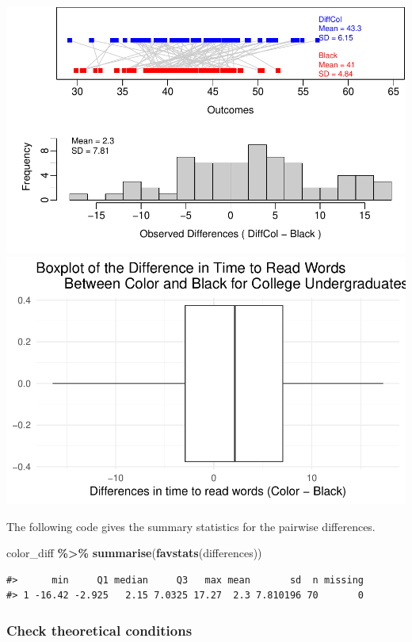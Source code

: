 \documentclass[
]{report}
\newenvironment{Shaded}{\begin{snugshade}}{\end{snugshade}}
\newcommand{\FunctionTok}[1]{\textcolor[rgb]{0.13,0.29,0.53}{\textbf{#1}}}
\newcommand{\NormalTok}[1]{#1}
\newcommand{\SpecialCharTok}[1]{\textcolor[rgb]{0.81,0.36,0.00}{\textbf{#1}}}
\begin{document}
\begin{center}\includegraphics[width=0.7\linewidth]{11-A23-paired-theory_files/figure-latex/unnamed-chunk-1-1} \includegraphics[width=0.7\linewidth]{11-A23-paired-theory_files/figure-latex/unnamed-chunk-1-2} \end{center}

The following code gives the summary statistics for the pairwise differences.

\begin{Shaded}
\begin{Highlighting}[]
\NormalTok{color\_diff }\SpecialCharTok{\%\textgreater{}\%} 
  \FunctionTok{summarise}\NormalTok{(}\FunctionTok{favstats}\NormalTok{(differences))}
\end{Highlighting}
\end{Shaded}

\begin{verbatim}
#>      min     Q1 median     Q3   max mean       sd  n missing
#> 1 -16.42 -2.925   2.15 7.0325 17.27  2.3 7.810196 70       0
\end{verbatim}

\subsubsection*{Check theoretical conditions}\label{check-theoretical-conditions}
\end{document}
